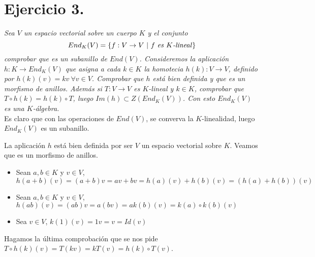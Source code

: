 
\section{Ejercicio 3.} \emph{Sea \(V\) un espacio vectorial sobre un cuerpo \(K\)
  y el
  conjunto}
\[
End_K(V) = \{f:V \to V \ | \ f \text{ \emph{es} } K\text{\emph{-lineal}}\}
\]
\emph{comprobar que es un subanillo de \(End(V)\). Consideremos la aplicación \(h:K \to End_K(V)\)
que asigna a cada \(k \in K\) la homotecia \(h(k):V \to V\), definido por
\(h(k)(v) = kv \ \forall v \in V\). Comprobar que \(h\) está bien definida y que es
un morfismo de anillos. Además si \(T:V \to V\) es \(K\)-lineal y \(k \in K\),
comprobar que \(T \circ h(k) = h(k) \circ T\), luego \(Im(h) \subset
Z(End_K(V))\). Con esto \(End_K(V)\) es una \(K\)-álgebra.}\\

Es claro que con las operaciones de \(End(V)\), se converva la \(K\)-linealidad,
luego \(End_K(V)\) es un subanillo.

La aplicación \(h\) está bien definida por ser \(V\) un espacio vectorial sobre
\(K\). Veamos que es un morfismo de anillos.
\begin{itemize}
\item Sean \(a,b \in K\) y \(v \in V\), \(h(a + b)(v) = (a+b)v = av + bv =
  h(a)(v) + h(b)(v) = (h(a) + h(b))(v) \)
\item Sean \(a,b \in K\) y \(v \in V\), \(h(ab)(v) = (ab)v = a(bv) =
  ak(b)(v) = k(a)\circ k(b) (v) \)
\item Sea \(v \in V\), \(k(1)(v) = 1v = v = Id(v)\)
\end{itemize}

Hagamos la última comprobación que se nos pide \(T \circ h(k) (v) = T(kv) =
kT(v) = h(k) \circ T (v)\).
